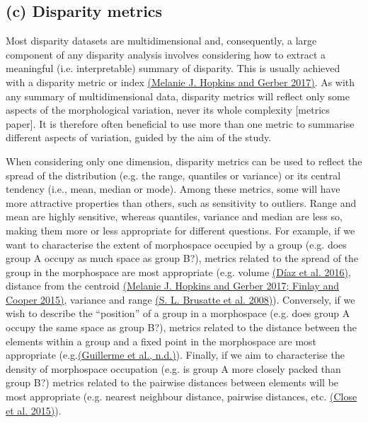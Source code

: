 \hypertarget{c-disparity-metrics}{%
\subsection{(c) Disparity metrics}\label{c-disparity-metrics}}

Most disparity datasets are multidimensional and, consequently, a large
component of any disparity analysis involves considering how to extract
a meaningful (i.e. interpretable) summary of disparity. This is usually
achieved with a disparity metric or index
\href{https://paperpile.com/c/sTGYvp/vTHS}{(Melanie J. Hopkins and
Gerber 2017)}. As with any summary of multidimensional data, disparity
metrics will reflect only some aspects of the morphological variation,
never its whole complexity {[}metrics paper{]}. It is therefore often
beneficial to use more than one metric to summarise different aspects of
variation, guided by the aim of the study.

When considering only one dimension, disparity metrics can be used to
reflect the spread of the distribution (e.g. the range, quantiles or
variance) or its central tendency (i.e., mean, median or mode). Among
these metrics, some will have more attractive properties than others,
such as sensitivity to outliers. Range and mean are highly sensitive,
whereas quantiles, variance and median are less so, making them more or
less appropriate for different questions. For example, if we want to
characterise the extent of morphospace occupied by a group (e.g. does
group A occupy as much space as group B?), metrics related to the spread
of the group in the morphospace are most appropriate (e.g. volume
\href{https://paperpile.com/c/sTGYvp/47fI}{(Díaz et al. 2016)}, distance
from the centroid
\href{https://paperpile.com/c/sTGYvp/vTHS+yyNa}{(Melanie J. Hopkins and
Gerber 2017; Finlay and Cooper 2015)}, variance and range
\href{https://paperpile.com/c/sTGYvp/tGyd}{(S. L. Brusatte et al.
2008)}). Conversely, if we wish to describe the ``position'' of a group
in a morphospace (e.g. does group A occupy the same space as group B?),
metrics related to the distance between the elements within a group and
a fixed point in the morphospace are most appropriate
(e.g.\href{https://paperpile.com/c/sTGYvp/u1KE}{(Guillerme et al.,
n.d.)}). Finally, if we aim to characterise the density of morphospace
occupation (e.g. is group A more closely packed than group B?) metrics
related to the pairwise distances between elements will be most
appropriate (e.g. nearest neighbour distance, pairwise distances, etc.
\href{https://paperpile.com/c/sTGYvp/PbSx}{(Close et al. 2015)}).

